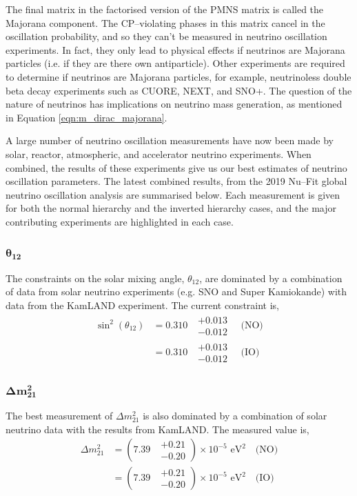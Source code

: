 The final matrix in the factorised version of the PMNS matrix is called the 
Majorana component. The CP--violating phases in this matrix cancel in the 
oscillation probability, and so they can't be measured in neutrino oscillation 
experiments.  In fact, they only lead to physical effects if neutrinos are 
Majorana particles (i.e. if they are there own antiparticle). Other experiments 
are required to determine if neutrinos are Majorana particles, for example, 
neutrinoless double beta decay experiments such as CUORE\cite{Arnaboldi2004}, 
NEXT\cite{Alvarez2012}, and SNO+\cite{Andringa2016}. The question of the 
nature of neutrinos has implications on neutrino mass generation, as mentioned 
in Equation \ref{eqn:m_dirac_majorana}.

A large number of neutrino oscillation measurements have now been made by
solar, reactor, atmospheric, and accelerator neutrino experiments. When
combined, the results of these experiments give us our best estimates of 
neutrino oscillation parameters. The latest combined results, from the 2019 
Nu--Fit global neutrino oscillation analysis\cite{Esteban:2018azc} are 
summarised below.  Each measurement is given for both the normal hierarchy and 
the inverted hierarchy cases, and the major contributing experiments are
highlighted in each case.

\subsubsection*{$\boldsymbol{\theta_{12}}$}

The constraints on the solar mixing angle, $\theta_{12}$, are dominated by a
combination of data from solar neutrino experiments (e.g. SNO\cite{Ahmad2002}
and Super Kamiokande\cite{PhysRevLett.86.5651}) with data from the KamLAND 
experiment\cite{Araki2005}. The current constraint is,
\begin{align*}
	\sin^2(\theta_{12}) &= 0.310 \mbox{ } \substack{+ 0.013 \\ - 0.012} \quad \mbox{(NO)} \\
	                    &= 0.310 \mbox{ } \substack{+ 0.013 \\ - 0.012} \quad \mbox{(IO)}
\end{align*}

\subsubsection*{$\boldsymbol{\Delta m^2_{21}}$}

The best measurement of $\Delta m^2_{21}$ is also dominated by a combination of
solar neutrino data with the results from KamLAND. The measured value is,
\begin{align*}
	\Delta m^2_{21} &= (7.39 \mbox{ } \substack{+ 0.21 \\ - 0.20}) \times 10^{-5} \mbox{  eV}^2 \quad \mbox{(NO)} \\
	                &= (7.39 \mbox{ } \substack{+ 0.21 \\ - 0.20}) \times 10^{-5} \mbox{  eV}^2 \quad \mbox{(IO)} \\
\end{align*}

